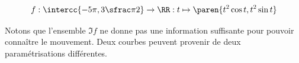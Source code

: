 \begin{frame}
  \begin{center}
  \end{center}
  \begin{align*}
    f : \intercc{-5\pi, 3\sfrac\pi2} \to \RR : t \mapsto \paren{t^{2} \cos t, t^{2} \sin t}
  \end{align*}\pause{}

  \begin{remark}\pause{}
    Notons que l'ensemble \(\Im f\) ne donne pas une information suffisante pour pouvoir connaître le mouvement. Deux courbes peuvent provenir de deux paramétrisations différentes.
  \end{remark}
\end{frame}
\begin{frame}
  
\end{frame}
